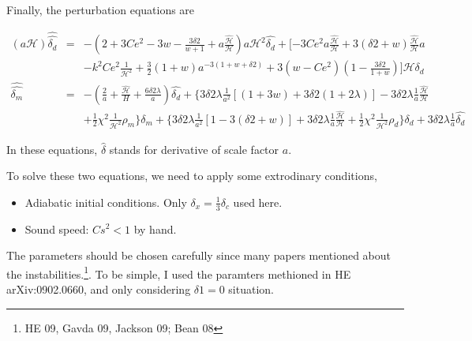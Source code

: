 \documentclass{article}
\begin{document}
{\color{blue}

Finally, the perturbation equations are

\begin{eqnarray}
(a\mathcal H) \hat{\hat{\delta_d}} &=& - (2+3 Ce^2-3w-\frac{3\delta2}{w+1}+a\frac{\hat{\mathcal H}}{\mathcal H})a\mathcal H^2 \hat{\delta_d} + [-3Ce^2 a \frac{\hat{\mathcal H}}{\mathcal H} + 3(\delta 2 + w)\frac{\hat{\mathcal H}}{\mathcal H} a \\
&& - k^2 Ce^2\frac{1}{\mathcal H^2} +\frac{3}{2}(1+w)a^{-3(1+w+\delta 2)} + 3(w-Ce^2)(1-\frac{3\delta 2}{1+w})]\mathcal H \delta_d \\
\hat{\hat{\delta_m}} &=& -(\frac 2 a + \frac{\hat{\mathcal H}}{H} + \frac{6\delta2\lambda}{a})\hat{\delta_d} + \{ 3\delta 2 \lambda \frac{1}{a^2}[ (1 + 3w) + 3\delta2 (1+2\lambda) ] - 3\delta2 \lambda \frac 1 a \frac{\hat{\mathcal H}}{\mathcal H} \\
&& + \frac 1 2 \chi^2 \frac{1}{\mathcal H^2}\rho_m \} \delta_m  + \{ 3\delta2 \lambda \frac{1}{a^2}[1-3(\delta2+w)] + 3\delta2\lambda \frac 1 a \frac{\hat{\mathcal H}}{\mathcal H} + \frac1 2 \chi^2\frac{1}{\mathcal H^2}\rho_d \}\delta_d + 3\delta2\lambda\frac 1 a \hat{\delta_d}
\end{eqnarray}

In these equations, $\hat{\delta}$ stands for derivative of scale factor $a$.

To solve these two equations, we need to apply some extrodinary conditions,
\begin{itemize}
\item
Adiabatic initial conditions. Only $\delta_x=\frac13\delta_c$ used here.
\item
Sound speed: $Cs^2<1$ by hand.
\end{itemize}

The parameters should be chosen carefully since many papers mentioned about the instabilities.{\footnote{HE 09, Gavda 09, Jackson 09; Bean 08}}. To be simple, I used the paramters methioned in HE arXiv:0902.0660, and only considering $\delta1=0$ situation.


}
\end{document}
